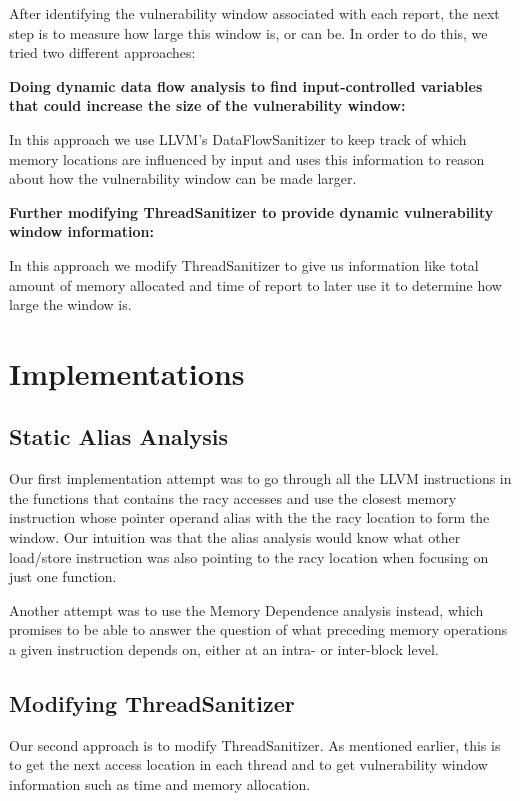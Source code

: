 \documentclass{acm_proc_article-sp}
\begin{document}
After identifying the vulnerability window associated with each report, the next step is to measure how large this window is, or can be. In order to do this, we tried two different approaches:

\textbf{Doing dynamic data flow analysis to find input-controlled variables that could increase the size of the vulnerability window:}

In this approach we use LLVM's DataFlowSanitizer to keep track of which memory locations are influenced by input and uses this information to reason about how the vulnerability window can be made larger.

\textbf{Further modifying ThreadSanitizer to provide dynamic vulnerability window information:}

In this approach we modify ThreadSanitizer to give us information like total amount of memory allocated and time of report to later use it to determine how large the window is.

\section{Implementations}
\subsection{Static Alias Analysis}
Our first implementation attempt was to go through all the LLVM instructions in the functions that contains the racy accesses and use the closest memory instruction whose pointer operand alias with the the racy location to form the window. Our intuition was that the alias analysis would know what other load/store instruction was also pointing to the racy location when focusing on just one function. 

Another attempt was to use the Memory Dependence analysis instead, which promises to be able to answer the question of what preceding memory operations a given instruction depends on, either at an intra- or inter-block level. 

\subsection{Modifying ThreadSanitizer}

Our second approach is to modify ThreadSanitizer. As mentioned earlier, this is to get the next access location in each thread and to get vulnerability window information such as time and memory allocation. 
\end{document}
